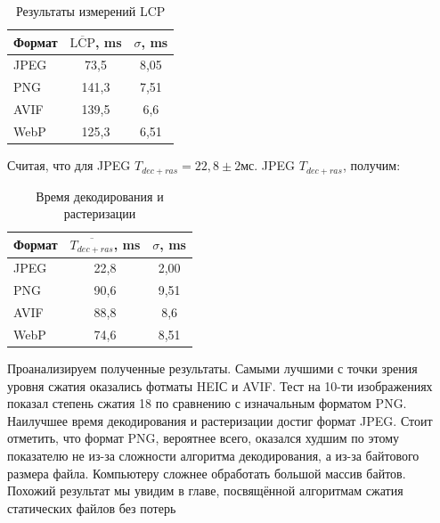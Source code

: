 \documentclass[12pt]{article}
\begin{document}
\begin{table}[H]
    \centering
    \caption{Результаты измерений LCP}
    \begin{tabular}{l S[table-format=3.1] S[table-format=2.2]}
        \toprule
        Формат & {$\overline{\text{LCP}}$, \si{\milli\second}} & {$\sigma$, \si{\milli\second}} \\
        \midrule
        JPEG   & 73,5                                          & 8,05                           \\
        PNG    & 141,3                                         & 7,51                           \\
        AVIF   & 139,5                                         & 6,6                            \\
        WebP   & 125,3                                         & 6,51                           \\
        \bottomrule
    \end{tabular}
\end{table}

Считая, что для JPEG $T_{dec+ras} = 22,8 \pm 2 \text{мс}$. JPEG $T_{dec+ras}$, получим:

\begin{table}[H]
    \centering
    \caption{Время декодирования и растеризации}
    \begin{tabular}{l S[table-format=2.1] S[table-format=1.2]}
        \toprule
        Формат & {$\overline{T_{dec+ras}}$, \si{\milli\second}} & {$\sigma$, \si{\milli\second}} \\
        \midrule
        JPEG   & 22,8                                           & 2,00                           \\
        PNG    & 90,6                                           & 9,51                           \\
        AVIF   & 88,8                                           & 8,6                            \\
        WebP   & 74,6                                           & 8,51                           \\
        \bottomrule
    \end{tabular}
\end{table}

Проанализируем полученные результаты. Самыми лучшими с точки зрения уровня сжатия оказались фотматы HEIС и AVIF.
Тест на 10-ти изображениях показал степень сжатия 18 по сравнению с изначальным форматом PNG.
Наилучшее время декодирования и растеризации достиг формат JPEG. Стоит отметить, что формат PNG, вероятнее всего, оказался худшим по этому показателю не из-за сложности алгоритма декодирования, а из-за байтового размера файла. Компьютеру сложнее обработать большой массив байтов. Похожий результат мы увидим в главе, посвящённой алгоритмам сжатия статических файлов без потерь
\end{document}
